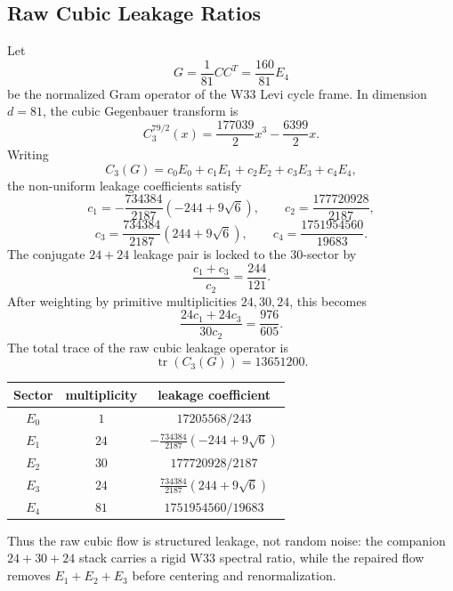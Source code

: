 
\subsection{Raw Cubic Leakage Ratios}\label{subsec:raw-cubic-leakage-ratios}

Let
\[
G=\frac{1}{81}CC^T=\frac{160}{81}E_4
\]
be the normalized Gram operator of the W33 Levi cycle frame.  In dimension
$d=81$, the cubic Gegenbauer transform is
\[
C_3^{79/2}(x)=\frac{177039}{2}x^3-\frac{6399}{2}x.
\]
Writing
\[
C_3(G)=c_0E_0+c_1E_1+c_2E_2+c_3E_3+c_4E_4,
\]
the non-uniform leakage coefficients satisfy
\[
c_1=-\frac{734384}{2187}(-244+9\sqrt6),\qquad
c_2=\frac{177720928}{2187},
\]
\[
c_3=\frac{734384}{2187}(244+9\sqrt6),\qquad
c_4=\frac{1751954560}{19683}.
\]
The conjugate $24+24$ leakage pair is locked to the $30$-sector by
\[
\boxed{\frac{c_1+c_3}{c_2}=\frac{244}{121}.}
\]
After weighting by primitive multiplicities $24,30,24$, this becomes
\[
\boxed{\frac{24c_1+24c_3}{30c_2}=\frac{976}{605}.}
\]
The total trace of the raw cubic leakage operator is
\[
\boxed{\operatorname{tr}(C_3(G))=13651200.}
\]

\begin{center}
\begin{tabular}{c|c|c}
Sector & multiplicity & leakage coefficient \\
\hline
$E_0$ & $1$ & $17205568/243$ \\
$E_1$ & $24$ & $-\frac{734384}{2187}(-244+9\sqrt6)$ \\
$E_2$ & $30$ & $177720928/2187$ \\
$E_3$ & $24$ & $\frac{734384}{2187}(244+9\sqrt6)$ \\
$E_4$ & $81$ & $1751954560/19683$
\end{tabular}
\end{center}

Thus the raw cubic flow is structured leakage, not random noise: the companion
$24+30+24$ stack carries a rigid W33 spectral ratio, while the repaired flow
removes $E_1+E_2+E_3$ before centering and renormalization.
